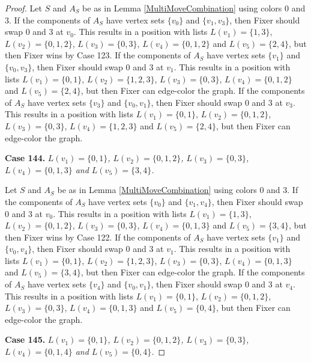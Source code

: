 \documentclass[12pt]{amsart}
\theoremstyle{plain}
\theoremstyle{definition}
\theoremstyle{remark}
\begin{document}
\begin{proof}
Let $S$ and $A_S$ be as in Lemma \ref{MultiMoveCombination} using colors $0$ and $3$. If the components of $A_S$ have vertex sets $\{v_0\}$ and $\{v_1, v_3\}$, then Fixer should swap 0 and 3 at $v_0$. This results in a position with lists $L(v_1) = \{1, 3\}$, $L(v_2) = \{0, 1, 2\}$, $L(v_3) = \{0, 3\}$, $L(v_4) = \{0, 1, 2\}$ and $L(v_5) = \{2, 4\}$, but then Fixer wins by Case 123.
If the components of $A_S$ have vertex sets $\{v_1\}$ and $\{v_0, v_3\}$, then Fixer should swap 0 and 3 at $v_1$. This results in a position with lists $L(v_1) = \{0, 1\}$, $L(v_2) = \{1, 2, 3\}$, $L(v_3) = \{0, 3\}$, $L(v_4) = \{0, 1, 2\}$ and $L(v_5) = \{2, 4\}$, but then Fixer can edge-color the graph.
If the components of $A_S$ have vertex sets $\{v_3\}$ and $\{v_0, v_1\}$, then Fixer should swap 0 and 3 at $v_3$. This results in a position with lists $L(v_1) = \{0, 1\}$, $L(v_2) = \{0, 1, 2\}$, $L(v_3) = \{0, 3\}$, $L(v_4) = \{1, 2, 3\}$ and $L(v_5) = \{2, 4\}$, but then Fixer can edge-color the graph.

\noindent\textbf{Case 144.  }\textit{$L(v_1) = \{0, 1\}$, $L(v_2) = \{0, 1, 2\}$, $L(v_3) = \{0, 3\}$, $L(v_4) = \{0, 1, 3\}$ and $L(v_5) = \{3, 4\}$.}

Let $S$ and $A_S$ be as in Lemma \ref{MultiMoveCombination} using colors $0$ and $3$. If the components of $A_S$ have vertex sets $\{v_0\}$ and $\{v_1, v_4\}$, then Fixer should swap 0 and 3 at $v_0$. This results in a position with lists $L(v_1) = \{1, 3\}$, $L(v_2) = \{0, 1, 2\}$, $L(v_3) = \{0, 3\}$, $L(v_4) = \{0, 1, 3\}$ and $L(v_5) = \{3, 4\}$, but then Fixer wins by Case 122.
If the components of $A_S$ have vertex sets $\{v_1\}$ and $\{v_0, v_4\}$, then Fixer should swap 0 and 3 at $v_1$. This results in a position with lists $L(v_1) = \{0, 1\}$, $L(v_2) = \{1, 2, 3\}$, $L(v_3) = \{0, 3\}$, $L(v_4) = \{0, 1, 3\}$ and $L(v_5) = \{3, 4\}$, but then Fixer can edge-color the graph.
If the components of $A_S$ have vertex sets $\{v_4\}$ and $\{v_0, v_1\}$, then Fixer should swap 0 and 3 at $v_4$. This results in a position with lists $L(v_1) = \{0, 1\}$, $L(v_2) = \{0, 1, 2\}$, $L(v_3) = \{0, 3\}$, $L(v_4) = \{0, 1, 3\}$ and $L(v_5) = \{0, 4\}$, but then Fixer can edge-color the graph.

\noindent\textbf{Case 145.  }\textit{$L(v_1) = \{0, 1\}$, $L(v_2) = \{0, 1, 2\}$, $L(v_3) = \{0, 3\}$, $L(v_4) = \{0, 1, 4\}$ and $L(v_5) = \{0, 4\}$.}


\end{proof}
\end{document}

